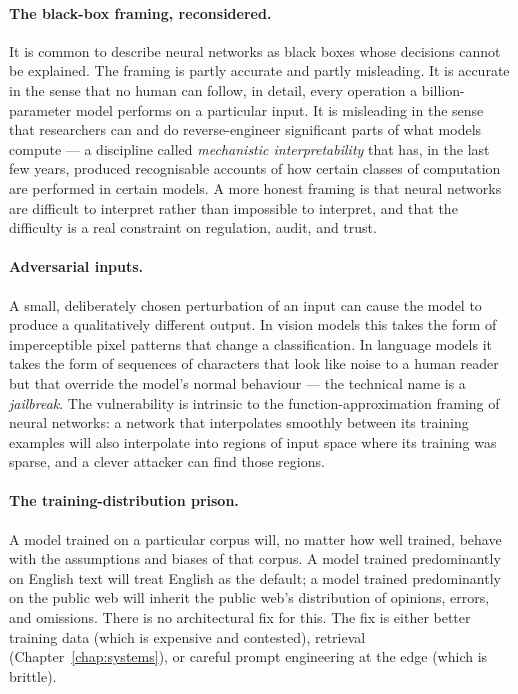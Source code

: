 \paragraph{The black-box framing, reconsidered.} It is common
to describe neural networks as black boxes whose decisions
cannot be explained. The framing is partly accurate and partly
misleading. It is accurate in the sense that no human can
follow, in detail, every operation a billion-parameter model
performs on a particular input. It is misleading in the sense
that researchers can and do reverse-engineer significant parts
of what models compute --- a discipline called \emph{mechanistic
interpretability} that has, in the last few years, produced
recognisable accounts of how certain classes of computation are
performed in certain models. A more honest framing is that
neural networks are difficult to interpret rather than
impossible to interpret, and that the difficulty is a real
constraint on regulation, audit, and trust.

\paragraph{Adversarial inputs.} A small, deliberately chosen
perturbation of an input can cause the model to produce a
qualitatively different output. In vision models this takes the
form of imperceptible pixel patterns that change a
classification. In language models it takes the form of
sequences of characters that look like noise to a human reader
but that override the model's normal behaviour --- the technical
name is a \emph{jailbreak}. The vulnerability is intrinsic to
the function-approximation framing of neural networks: a
network that interpolates smoothly between its training
examples will also interpolate into regions of input space where
its training was sparse, and a clever attacker can find those
regions.

\paragraph{The training-distribution prison.} A model trained
on a particular corpus will, no matter how well trained, behave
with the assumptions and biases of that corpus. A model trained
predominantly on English text will treat English as the default;
a model trained predominantly on the public web will inherit
the public web's distribution of opinions, errors, and
omissions. There is no architectural fix for this. The fix is
either better training data (which is expensive and contested),
retrieval (Chapter~\ref{chap:systems}), or careful prompt engineering at the
edge (which is brittle).

